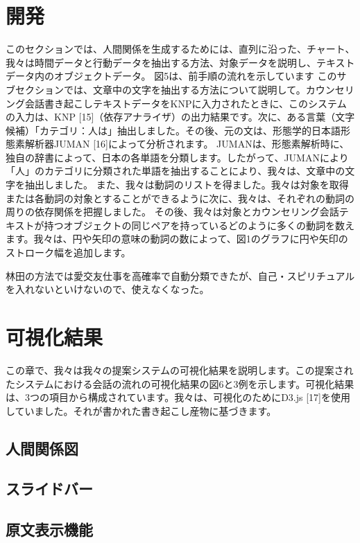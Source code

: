 \documentclass[shuuron]{kuee}
\begin{document}
\section{開発}

  このセクションでは、人間関係を生成するためには、直列に沿った、チャート、我々は時間データと行動データを抽出する方法、対象データを説明し、テキストデータ内のオブジェクトデータ。 図5は、前手順の流れを示しています
  このサブセクションでは、文章中の文字を抽出する方法について説明して。カウンセリング会話書き起こしテキストデータをKNPに入力されたときに、このシステムの入力は、KNP [15]（依存アナライザ）の出力結果です。次に、ある言葉（文字候補）「カテゴリ：人は」抽出しました。その後、元の文は、形態学的日本語形態素解析器JUMAN [16]によって分析されます。 JUMANは、形態素解析時に、独自の辞書によって、日本の各単語を分類します。したがって、JUMANにより「人」のカテゴリに分類された単語を抽出することにより、我々は、文章中の文字を抽出しました。
  また、我々は動詞のリストを得ました。我々は対象を取得または各動詞の対象とすることができるように次に、我々は、それぞれの動詞の周りの依存関係を把握しました。
  その後、我々は対象とカウンセリング会話テキストが持つオブジェクトの同じペアを持っているどのように多くの動詞を数えます。我々は、円や矢印の意味の動詞の数によって、図1のグラフに円や矢印のストローク幅を追加します。

  林田の方法では愛交友仕事を高確率で自動分類できたが、自己・スピリチュアルを入れないといけないので、使えなくなった。



\section{可視化結果}

この章で、我々は我々の提案システムの可視化結果を説明します。この提案されたシステムにおける会話の流れの可視化結果の図6と3例を示します。可視化結果は、3つの項目から構成されています。我々は、可視化のためにD3.js [17]を使用していました。それが書かれた書き起こし産物に基づきます。

\subsection{人間関係図}

\subsection{スライドバー}

\subsection{原文表示機能}
\end{document}
